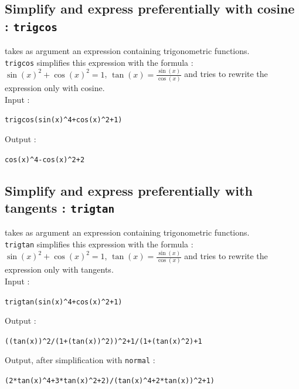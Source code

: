 \documentclass[a4paper,11pt]{book}
\begin{document}
\subsection{Simplify and express preferentially with cosine : {\tt trigcos}}
 takes as argument an expression
containing trigonometric functions.\\
{\tt trigcos} simplifies this expression with the formula :\\
$\sin(x)^2+\cos(x)^2=1$, $\displaystyle \tan(x)=\frac{\sin(x)}{\cos(x)}$  and  
tries to rewrite the expression only with cosine.\\ 
Input :
\begin{center}{\tt trigcos(sin(x)\verb|^|4+cos(x)\verb|^|2+1)}\end{center}
Output :
\begin{center}{\tt cos(x)\verb|^|4-cos(x)\verb|^|2+2}\end{center}

\subsection{Simplify and express preferentially with tangents : {\tt trigtan}}
 takes as argument an expression 
containing trigonometric functions.\\
{\tt trigtan} simplifies this expression with the formula :\\
$\sin(x)^2+\cos(x)^2=1$, $\displaystyle \tan(x)=\frac{\sin(x)}{\cos(x)}$ and  
tries to rewrite the expression only with tangents.\\ 
Input :
\begin{center}{\tt trigtan(sin(x)\verb|^|4+cos(x)\verb|^|2+1)}\end{center}
Output :
\begin{center}{\tt((tan(x))\verb|^|2/(1+(tan(x))\verb|^|2))\verb|^|2+1/(1+(tan(x)\verb|^|2)+1}\end{center}
Output, after simplification with {\tt normal} :
\begin{center}{\tt (2*tan(x)\verb|^|4+3*tan(x)\verb|^|2+2)/(tan(x)\verb|^|4+2*tan(x))\verb|^|2+1)}\end{center}
\end{document}
